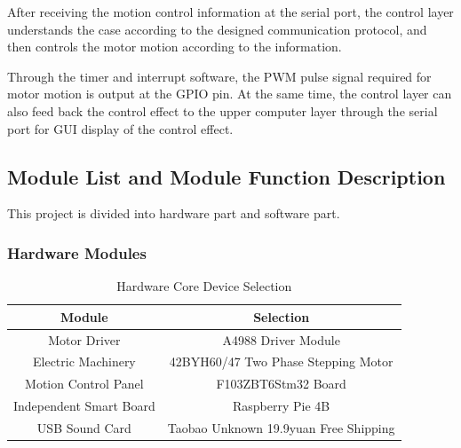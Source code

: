 \documentclass{hci}
\begin{document}
After receiving the motion control information at the serial port, the control layer understands the case according to the designed communication protocol, and then controls the motor motion according to the information.

Through the timer and interrupt software, the PWM pulse signal required for motor motion is output at the GPIO pin. At the same time, the control layer can also feed back the control effect to the upper computer layer through the serial port for GUI display of the control effect.

\subsection{Module List and Module Function Description}
This project is divided into hardware part and software part.
\subsubsection{Hardware Modules}
\begin{table}[htbp] %
	\caption{Hardware Core Device Selection} %
	\centering
	\label{t1}
	\begin{tabular}{c|c} %
		\hline
		\hline
		Module& Selection                                                                                                                                         \\
		\hline Motor Driver&A4988 Driver Module\\
		\hline Electric Machinery &42BYH60/47 Two Phase Stepping Motor\\
		\hline	Motion Control Panel&F103ZBT6Stm32 Board\\
		\hline Independent Smart Board&Raspberry Pie 4B\\
		\hline USB Sound Card&Taobao Unknown 19.9yuan Free Shipping\\
		\hline
	\end{tabular}
\end{table}
\end{document}
